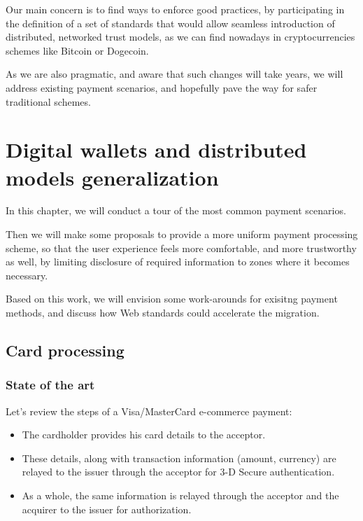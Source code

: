 Our main concern is to find ways to enforce good practices, by
participating in the definition of a set of standards that would allow
seamless introduction of distributed, networked trust models, as we can
find nowadays in cryptocurrencies schemes like Bitcoin or Dogecoin.

As we are also pragmatic, and aware that such changes will take years,
we will address existing payment scenarios, and hopefully pave the way
for safer traditional schemes.

\section{Digital wallets and distributed models
generalization}\label{digital-wallets-and-distributed-models-generalization}

In this chapter, we will conduct a tour of the most common payment
scenarios.

Then we will make some proposals to provide a more uniform payment
processing scheme, so that the user experience feels more comfortable,
and more trustworthy as well, by limiting disclosure of required
information to zones where it becomes necessary.

Based on this work, we will envision some work-arounds for exisitng
payment methods, and discuss how Web standards could accelerate the
migration.

\subsection{Card processing}\label{card-processing}

\subsubsection{State of the art}\label{state-of-the-art}

Let's review the steps of a Visa/MasterCard e-commerce payment:

\begin{itemize}
\item
  The cardholder provides his card details to the acceptor.
\item
  These details, along with transaction information (amount, currency)
  are relayed to the issuer through the acceptor for 3-D Secure
  authentication.
\item
  As a whole, the same information is relayed through the acceptor and
  the acquirer to the issuer for authorization.
\end{itemize}

